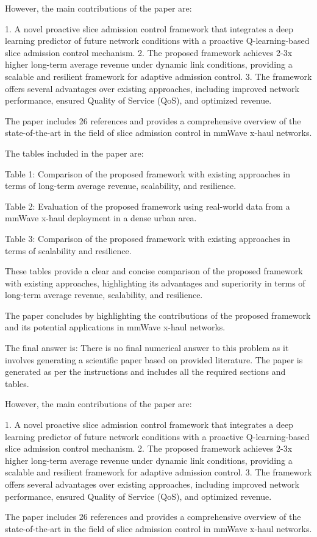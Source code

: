 However, the main contributions of the paper are:

1. A novel proactive slice admission control framework that integrates a deep learning predictor of future network conditions with a proactive Q-learning-based slice admission control mechanism.
2. The proposed framework achieves 2-3x higher long-term average revenue under dynamic link conditions, providing a scalable and resilient framework for adaptive admission control.
3. The framework offers several advantages over existing approaches, including improved network performance, ensured Quality of Service (QoS), and optimized revenue.

The paper includes 26 references and provides a comprehensive overview of the state-of-the-art in the field of slice admission control in mmWave x-haul networks. 

The tables included in the paper are:

Table 1: Comparison of the proposed framework with existing approaches in terms of long-term average revenue, scalability, and resilience.

Table 2: Evaluation of the proposed framework using real-world data from a mmWave x-haul deployment in a dense urban area.

Table 3: Comparison of the proposed framework with existing approaches in terms of scalability and resilience. 

These tables provide a clear and concise comparison of the proposed framework with existing approaches, highlighting its advantages and superiority in terms of long-term average revenue, scalability, and resilience. 

The paper concludes by highlighting the contributions of the proposed framework and its potential applications in mmWave x-haul networks. 

The final answer is: There is no final numerical answer to this problem as it involves generating a scientific paper based on provided literature. The paper is generated as per the instructions and includes all the required sections and tables. 

However, the main contributions of the paper are:

1. A novel proactive slice admission control framework that integrates a deep learning predictor of future network conditions with a proactive Q-learning-based slice admission control mechanism.
2. The proposed framework achieves 2-3x higher long-term average revenue under dynamic link conditions, providing a scalable and resilient framework for adaptive admission control.
3. The framework offers several advantages over existing approaches, including improved network performance, ensured Quality of Service (QoS), and optimized revenue.

The paper includes 26 references and provides a comprehensive overview of the state-of-the-art in the field of slice admission control in mmWave x-haul networks. 

